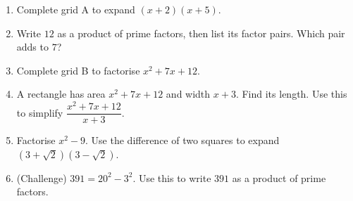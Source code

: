 \documentclass{beamer}
\newcommand{\ashow}[1]{\uncover<2->{\textcolor{red}{\small #1}}}
\newcommand{\tightlist}{%
  \setlength{\itemsep}{0pt}\setlength{\parskip}{0pt}\setlength{\topsep}{0pt}%
}
\begin{document}
\begin{frame}
\begin{columns}[T,onlytextwidth]
\vspace{-1.5em}
\footnotesize
\begin{enumerate}\tightlist
{}
  \item Complete grid A to expand $(x+2)(x+5)$.
        \ashow{$x^2+7x+10$}
  \item Write $12$ as a product of prime factors, then list its factor pairs. Which pair
        adds to $7$?
        \ashow{$2^2\times3$; \; $1\times12$, $2\times6$, $3\times4$; \; $3+4=7$}
  \item Complete grid B to factorise $x^2+7x+12$.
        \ashow{$(x+3)(x+4)$, in either order}
  \item A rectangle has area $x^2+7x+12$ and width $x+3$. Find its length.
        Use this to simplify $\dfrac{x^2+7x+12}{x+3}$.\\[2pt]
        \ashow{$\dfrac{(x+3)(x+4)}{x+3}=x+4$}
  \item Factorise $x^2-9$. Use the difference of two squares to expand
        $(3+\sqrt{2})(3-\sqrt{2})$.
        \ashow{$(x+3)(x-3)$; \; $9-2=7$}
  \item (Challenge) $391=20^2-3^2$. Use this to write $391$ as a product of prime factors.
        \ashow{$(20+3)(20-3)=23\times17$, both prime}
\end{enumerate}
\end{columns}
\end{frame}
\end{document}
